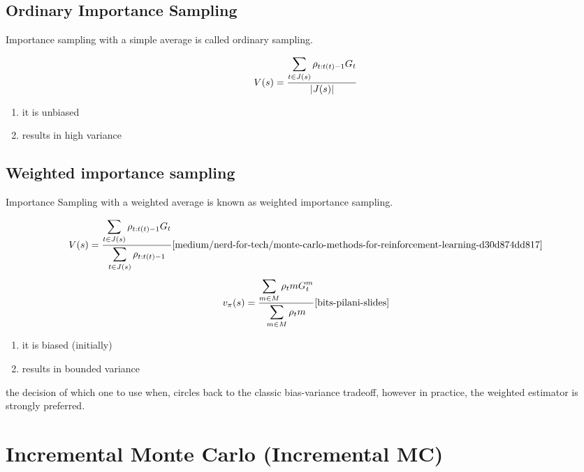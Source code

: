 \subsection{Ordinary Importance Sampling \cite{medium/nerd-for-tech/monte-carlo-methods-for-reinforcement-learning-d30d874dd817}}\label{RL: Ordinary Importance Sampling}

Importance sampling with a simple average is called ordinary sampling.

\[
    V(s) = \displaystyle\dfrac{\displaystyle\sum_{t\in J(s)} \rho_{t:t(t)-1}G_t}{\left| J(s) \right|}
\]

\begin{enumerate}
    \item it is unbiased
    \item results in high variance
\end{enumerate}

\subsection{Weighted importance sampling \cite{medium/nerd-for-tech/monte-carlo-methods-for-reinforcement-learning-d30d874dd817}}\label{RL: Weighted importance sampling}

Importance Sampling with a weighted average is known as weighted importance sampling.

\[
    V(s) = \displaystyle\dfrac{\dsum_{t\in J(s)} \rho_{t:t(t)-1}G_t}{\dsum_{t\in J(s)} \rho_{t:t(t)-1}} \hfill \text{\cite{medium/nerd-for-tech/monte-carlo-methods-for-reinforcement-learning-d30d874dd817}}
\]
\[
    v_\pi(s) = \displaystyle\dfrac{\dsum_{m\in M} \rho_t m G_t^m}{\dsum_{m\in M} \rho_t m} \hfill \text{\cite{bits-pilani-slides}}
\]

\begin{enumerate}
    \item it is biased (initially)
    \item results in bounded variance
\end{enumerate}

the decision of which one to use when, circles back to the classic bias-variance tradeoff, however in practice, the 
weighted estimator is strongly preferred.

\section{Incremental Monte Carlo (Incremental MC) \cite{redirect.cs.umbc.edu/courses/graduate/678/fall21/RL05}} \label{RL: Incremental Monte Carlo (Incremental MC)}

